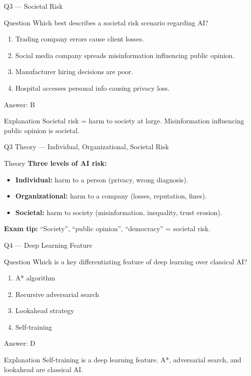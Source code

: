 \documentclass[aspectratio=169,8pt]{beamer}
\begin{document}
	\begin{frame}{Q3 --- Societal Risk}
		\begin{block}{Question}
			Which best describes a societal risk scenario regarding AI?
		\end{block}
		\begin{enumerate}[label=\Alph*.]
			\item Trading company errors cause client losses.
			\item Social media company spreads misinformation influencing public opinion.
			\item Manufacturer hiring decisions are poor.
			\item Hospital accesses personal info causing privacy loss.
		\end{enumerate}
		\begin{exampleblock}{Answer: B}
		\end{exampleblock}
		\begin{block}{Explanation}
			Societal risk = harm to society at large. Misinformation influencing public opinion is societal.
		\end{block}
	\end{frame}
	
	\begin{frame}{Q3 Theory --- Individual, Organizational, Societal Risk}
		\begin{block}{Theory}
			\textbf{Three levels of AI risk:}
			\begin{itemize}
				\item \textbf{Individual:} harm to a person (privacy, wrong diagnosis).
				\item \textbf{Organizational:} harm to a company (losses, reputation, fines).
				\item \textbf{Societal:} harm to society (misinformation, inequality, trust erosion).
			\end{itemize}
			\textbf{Exam tip:} ``Society'', ``public opinion'', ``democracy'' = societal risk.
		\end{block}
	\end{frame}
	
	\begin{frame}{Q4 --- Deep Learning Feature}
		\begin{block}{Question}
			Which is a key differentiating feature of deep learning over classical AI?
		\end{block}
		\begin{enumerate}[label=\Alph*.]
			\item A* algorithm
			\item Recursive adversarial search
			\item Lookahead strategy
			\item Self-training
		\end{enumerate}
		\begin{exampleblock}{Answer: D}
		\end{exampleblock}
		\begin{block}{Explanation}
			Self-training is a deep learning feature. A*, adversarial search, and lookahead are classical AI.
		\end{block}
	\end{frame}
	
\end{document}
